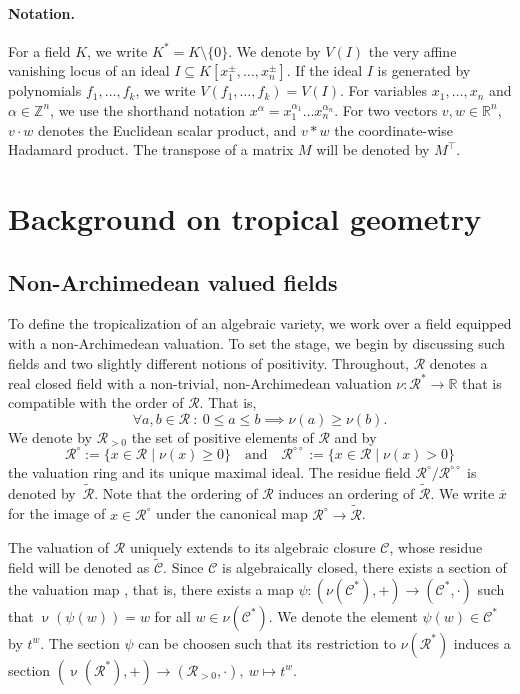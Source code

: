 \documentclass{article}
\theoremstyle{definition}
\DeclareMathOperator{\val}{\nu}
\newcommand{\RR}{\mathcal{R}}
\newcommand{\CC}{\mathcal{C}}
\begin{document}
\paragraph{\textbf{Notation. }}
For a field $K$, we write $K^* = K \setminus \{0\}$. We denote by $V(I)$ the very affine vanishing locus of an ideal $I \subseteq K[x_1^\pm, \dots, x_n^\pm]$. If the ideal $I$ is generated by polynomials $f_1, \dots ,f_k$, we write $V(f_1,\dots,f_k) = V(I)$. For variables $x_1, \dots , x_n$ and $\alpha \in \mathbb{Z}^n$, we use the shorthand notation $x^\alpha = x_1^{\alpha_1}\dots x_n^{\alpha_n}$. For two vectors $v,w \in \mathbb{R}^n$, $v\cdot w$ denotes the Euclidean scalar product, and $v \ast w$ the  coordinate-wise Hadamard product. The transpose of a matrix $M$ will be denoted by $M^\top$.

\section{Background on tropical geometry}
\label{Sec::RealTrop}
\subsection{Non-Archimedean valued fields}

To define the tropicalization of an algebraic variety, we work over a field equipped with a non-Archimedean valuation. To set the stage, we begin by discussing such fields and two slightly different notions of positivity.
\color{black}
Throughout, $\RR$ denotes a real closed field with a non-trivial, non-Archimedean valuation $\nu \colon \mathcal{R}^* \to \mathbb{R}$ that is compatible with the order of $\RR$. That is,
\[\forall a, b \in \RR \ : \ 0 \leq  a \leq b \implies \nu(a) \geq \nu(b).\] 
We denote by $\RR_{>0}$ the set of positive elements of $\RR$ and by 
\[ \RR^\circ := \big\{ x \in \RR \mid  \nu(x) \geq 0 \big\} \quad \text{and} \quad \RR^{\circ \circ} := \big\{ x \in \RR \mid  \nu(x) > 0 \big\} \]
the valuation ring and its unique maximal ideal. The residue field $\RR^\circ/ \RR^{\circ \circ}$ is denoted by~$\widetilde{\mathcal{R}}$. Note that the ordering of $\RR$ induces an ordering of $\widetilde{\mathcal{R}}$.
We write $\overline{x}$ for the image of $x \in \RR^\circ$ under the canonical map $\RR^\circ \to \widetilde{\mathcal{R}}$.

The valuation of $\RR$ uniquely extends to its algebraic closure $\CC$, whose residue field  will be denoted as  $\widetilde{\CC}$.
Since $\mathcal{C}$ is algebraically closed, there exists a section of the valuation map \cite[Lemma 2.1.15]{maclagan2015introduction}, that is, there exists a map $\psi\colon (\nu(\mathcal{C}^*),+) \to (\mathcal{C}^*,\cdot)$ such that $\val(\psi(w)) = w$ for all $w \in \nu(\mathcal{C}^*)$. We denote the element $\psi(w) \in \mathcal{C}^*$ by $t^w$. The section $\psi$ can be choosen such that its restriction to $\nu(\mathcal{R}^*)$ induces a section  $(  \val(\mathcal{R}^* ), +) \to (\mathcal{R}_{>0}, \cdot ), \ w \mapsto t^w$.
\end{document}

